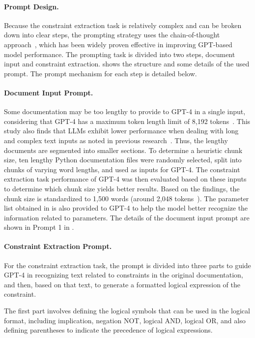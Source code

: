 \paragraph{Prompt Design.} 
Because the constraint extraction task is relatively complex and can be
broken down into clear steps, the prompting strategy uses the chain-of-thought approach~\cite{wei2022chain}, which has
been widely proven effective in improving GPT-based model performance. The prompting task is divided into two steps, document input and constraint extraction.  shows the
structure and some details of the used prompt.
The prompt mechanism for each step is detailed below.

\paragraph{Document Input Prompt.}
Some documentation may be too lengthy to provide to GPT-4 in a single input, considering that GPT-4 has a maximum token length limit of 8,192 tokens~\cite{modeltoken}. This study also finds that LLMs exhibit lower performance when dealing with long and complex text inputs as noted in previous research~\cite{han2024lm, jin2024llm}. Thus, the lengthy documents are segmented into smaller sections. To determine a heuristic chunk size, ten lengthy Python documentation files were randomly selected, split into chunks of varying word lengths, and used as inputs for GPT-4. The constraint extraction task performance of GPT-4 was then evaluated based on these inputs to determine which chunk size yields better results. Based on the findings, the chunk size is standardized to 1,500 words (around 2,048 tokens~\cite{tokencount}).
The parameter list obtained in  is also provided to GPT-4 to help the model better recognize the information related to parameters. The details of the document input prompt are shown in Prompt 1 in .

\paragraph{Constraint Extraction Prompt.}
For the constraint extraction task, the prompt is divided into three parts to guide GPT-4 in recognizing text related to constraints in the original documentation, and then, based on that text, to generate a formatted logical expression of the constraint.

The first part involves defining the logical symbols that can be used in the logical format, including implication, negation NOT, logical AND, logical OR, and also defining parentheses to indicate the precedence of logical expressions.

